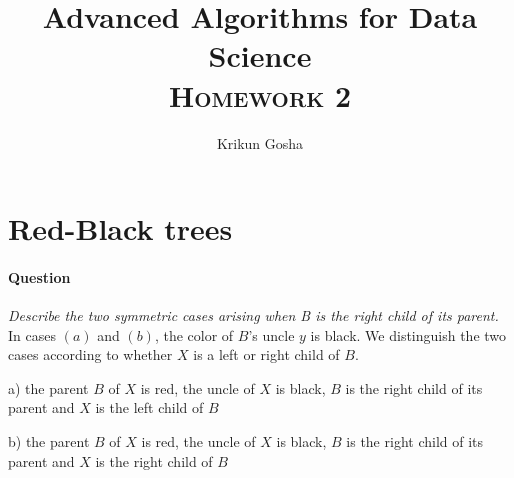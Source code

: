 \documentclass{article}
\title{Advanced Algorithms for Data Science \\ \textsc{Homework 2}}
\author{Krikun Gosha}
\date{}
\begin{document}
\maketitle
\section{Red-Black trees}
\paragraph{Question}
\textit{Describe the two symmetric cases arising when B is the right child of its parent.}\\

In cases $( a )$ and $( b )$, the color of $B$’s uncle $y$ is black. We
distinguish the two cases according to whether $X$ is a left or right child of
$B$. 

\begin{multicols}{2}

\begin{center}
\end{center}

  {\scriptsize
    a) the parent $B$ of $X$ is red, the uncle of $X$ is black, $B$ is the right
    child of its parent and $X$ is the left child of $B$
  }

  \columnbreak

\begin{center}
\end{center}

  {\scriptsize
    b) the parent $B$ of $X$ is red, the uncle of $X$ is black, $B$ is the right
    child of its parent and $X$ is the right child of $B$
  }
\end{multicols} 
\end{document}
